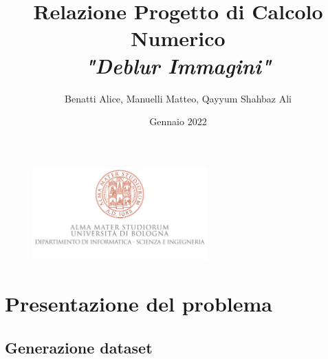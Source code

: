 \documentclass{article}
\title{\textbf{Relazione Progetto di Calcolo Numerico} \\ \textit{"Deblur Immagini"}}
\author{Benatti Alice, Manuelli Matteo, Qayyum Shahbaz Ali}
\date{Gennaio 2022}
\begin{document}
\maketitle
\begin{figure}[b]
    \centering
    \includegraphics[width=0.6\textwidth]{imgRel/alma-logo.jpg}
\end{figure}
\newpage

\tableofcontents
\newpage

\section{Presentazione del problema}

    \subsection{Generazione dataset}
    
    
    

    
    
    

    
    \newpage


\end{document}
